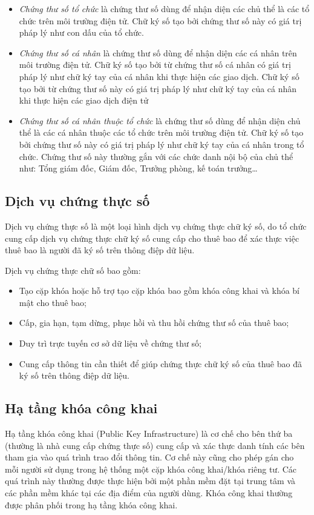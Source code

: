 \begin{itemize}
\item \emph{Chứng thư số tổ chức} là chứng thư số dùng để nhận diện các chủ thể là các tổ chức trên môi trường điện tử. Chữ ký số tạo bởi chứng thư số này có giá trị pháp lý như con dấu của tổ chức.
\item \emph{Chứng thư số cá nhân} là chứng thư số dùng để nhận diện các cá nhân trên môi trường điện tử. Chữ ký số tạo bởi từ chứng thư số cá nhân có giá trị pháp lý như chữ ký tay của cá nhân khi thực hiện các giao dịch. Chữ ký số tạo bởi từ chứng thư số này có giá trị pháp lý như chữ ký tay của cá nhân khi thực hiện các giao dịch điện tử
\item \emph{Chứng thư số cá nhân thuộc tổ chức} là chứng thư số dùng để nhận diện chủ thể là các cá nhân thuộc các tổ chức trên môi trường điện tử. Chữ ký số tạo bởi chứng thư số này có giá trị pháp lý như chữ ký tay của cá nhân trong tổ chức. Chứng thư số này thường gắn với các chức danh nội bộ của chủ thể như: Tổng giám đốc, Giám đốc, Trưởng phòng, kế toán trưởng…
\end{itemize}

\subsection{Dịch vụ chứng thực số}
Dịch vụ chứng thực số là một loại hình dịch vụ chứng thực chữ ký số, do tổ chức cung cấp dịch vụ chứng thực chữ ký số cung cấp cho thuê bao để xác thực việc thuê bao là người đã ký số trên thông điệp dữ liệu. 

Dịch vụ chứng thực chữ số bao gồm: 

\begin{itemize}
\item Tạo cặp khóa hoặc hỗ trợ tạo cặp khóa bao gồm khóa công khai và khóa bí mật cho thuê bao;
\item Cấp, gia hạn, tạm dừng, phục hồi và thu hồi chứng thư số của thuê bao; 
\item Duy trì trực tuyến cơ sở dữ liệu về chứng thư số; 
\item Cung cấp thông tin cần thiết để giúp chứng thực chữ ký số của thuê bao đã ký số trên thông điệp dữ liệu.
\end{itemize}

\subsection {Hạ tầng khóa công khai}
Hạ tầng khóa công khai (Public Key Infrastructure) là cơ chế cho bên thứ ba (thường là nhà cung cấp chứng thực số) cung cấp và xác thực danh tính các bên tham gia vào quá trình trao đổi thông tin. Cơ chế này cũng cho phép gán cho mỗi người sử dụng trong hệ thống một cặp khóa công khai/khóa riêng tư. Các quá trình này thường được thực hiện bởi một phần mềm đặt tại trung tâm và các phần mềm khác tại các địa điểm của người dùng. Khóa công khai thường được phân phối trong hạ tầng khóa công khai.


